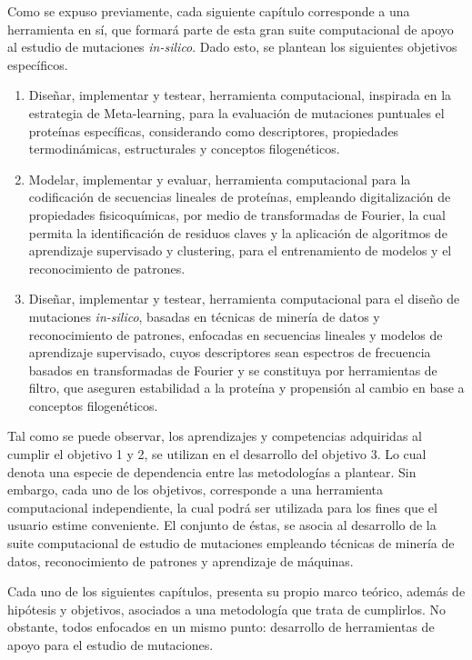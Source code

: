 Como se expuso previamente, cada siguiente capítulo corresponde a una herramienta en sí, que formará parte de esta gran suite computacional de apoyo al estudio de mutaciones \textit{in-silico}. Dado esto, se plantean los siguientes objetivos específicos.

\begin{enumerate}
	
	\item Diseñar, implementar y testear, herramienta computacional, inspirada en la estrategia de Meta-learning, para la evaluación de mutaciones puntuales el proteínas específicas, considerando como descriptores, propiedades termodinámicas, estructurales y conceptos filogenéticos. 
	
	\item Modelar, implementar y evaluar, herramienta computacional para la codificación de secuencias lineales de proteínas, empleando digitalización de propiedades fisicoquímicas, por medio de transformadas de Fourier, la cual permita la identificación de residuos claves y la aplicación de algoritmos de aprendizaje supervisado y clustering, para el entrenamiento de modelos y el reconocimiento de patrones.
	
	\item Diseñar, implementar y testear, herramienta computacional para el diseño de mutaciones \textit{in-silico}, basadas en técnicas de minería de datos y reconocimiento de patrones, enfocadas en secuencias lineales y modelos de aprendizaje supervisado, cuyos descriptores sean espectros de frecuencia basados en transformadas de Fourier y se constituya por herramientas de filtro, que aseguren estabilidad a la proteína y propensión al cambio en base a conceptos filogenéticos.
	
\end{enumerate}

Tal como se puede observar, los aprendizajes y competencias adquiridas al cumplir el objetivo 1 y 2, se utilizan en el desarrollo del objetivo 3. Lo cual denota una especie de dependencia entre las metodologías a plantear. Sin embargo, cada uno de los objetivos, corresponde a una herramienta computacional independiente, la cual podrá ser utilizada para los fines que el usuario estime conveniente. El conjunto de éstas, se asocia al desarrollo de la suite computacional de estudio de mutaciones empleando técnicas de minería de datos, reconocimiento de patrones y aprendizaje de máquinas.

Cada uno de los siguientes capítulos, presenta su propio marco teórico, además de hipótesis y objetivos, asociados a una metodología que trata de cumplirlos. No obstante, todos enfocados en un mismo punto: desarrollo de herramientas de apoyo para el estudio de mutaciones.